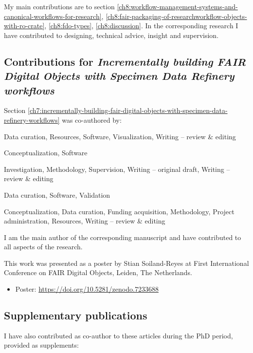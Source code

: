 My main contributions are to section \ref{ch8:workflow-management-systems-and-canonical-workflows-for-research}, \ref{ch8:fair-packaging-of-researchworkflow-objects-with-ro-crate}, \ref{ch8:fdo-types},
\ref{ch8:discussion}. In the corresponding research I have contributed to designing, technical advice, insight and supervision.


\subsection{Contributions for \emph{Incrementally
building FAIR Digital Objects with Specimen Data Refinery workflows}}

Section \vref{ch7:incrementally-building-fair-digital-objects-with-specimen-data-refinery-workflows} was co-authored by:

\begin{description}
\tightlist
\item[Oliver Woolland]
Data curation, Resources, Software, Visualization, Writing -- review \&
editing
\item[Paul Brack]
Conceptualization, Software
\item[Stian Soiland-Reyes]
Investigation, Methodology, Supervision, Writing -- original draft,
Writing -- review \& editing
\item[Ben Scott]
Data curation, Software, Validation
\item[Laurence Livermore]
Conceptualization, Data curation, Funding acquisition, Methodology,
Project administration, Resources, Writing -- review \& editing
\end{description}

I am the main author of the corresponding manuscript and have contributed to all aspects of the research. 


This work was presented as a poster by Stian Soiland-Reyes at First International Conference on FAIR Digital Objects, Leiden, The Netherlands.

\begin{itemize}
\tightlist
\item
  Poster: \url{https://doi.org/10.5281/zenodo.7233688}
\end{itemize}


\subsection{Supplementary publications}\label{ch10:supplementary-publications}

I have also contributed as co-author to these articles during the PhD
period, provided as supplements:

